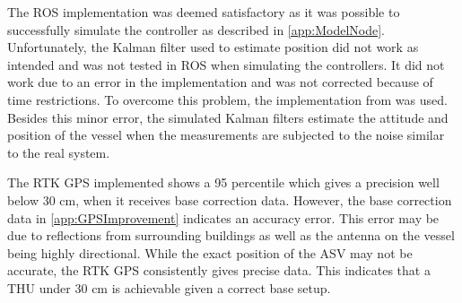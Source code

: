 The ROS implementation was deemed satisfactory as it was possible to successfully simulate the controller as described in \autoref{app:ModelNode}. Unfortunately, the Kalman filter used to estimate position did not work as intended and was not tested in ROS when simulating the controllers. It did not work due to an error in the implementation and was not corrected because of time restrictions. To overcome this problem, the implementation from \cite{thesis} was used. Besides this minor error, the simulated Kalman filters estimate the attitude and position of the vessel when the measurements are subjected to the noise similar to the real system.

The RTK GPS implemented shows a 95 percentile which gives a precision well below 30 cm, when it receives base correction data. However, the base correction data in \autoref{app:GPSImprovement} indicates an accuracy error. This error may be due to reflections from surrounding buildings as well as the antenna on the vessel being highly directional. While the exact position of the ASV may not be accurate, the RTK GPS consistently gives precise data. This indicates that a THU under 30 cm is achievable given a correct base setup.

